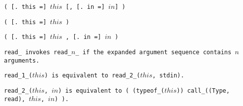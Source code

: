 
\s\s\s\tt{(} [\tt{. this =}] $this$ [\tt{,} [\tt{. in =}] $in$] \tt{)}

\s\tt{(}   [\tt{. this =}] $this$ \phantom{[}\tt{)}

\s\tt{(}   [\tt{. this =}] $this$ \phantom{[}\tt{,}
[\tt{. in =}] $in$\phantom{]} \tt{)}


\tt{read_} invokes \tt{read_}$n$\_ if the expanded
argument sequence contains $n$ arguments.

\tt{read_1_(}$this$\tt{)} is equivalent to \tt{read_2_(}$this$\tt{, stdin)}.

\tt{read_2_(}$this$\tt{,} $in$\tt{)} is equivalent to
\tt{( (typeof_(}$this$\tt{)) call_((Type, read),} $this$\tt{,} $in$\tt{) )}.
